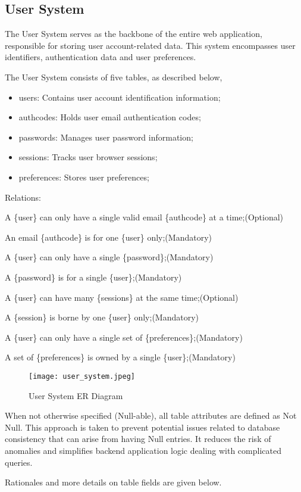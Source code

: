 \documentclass[12pt]{report}
\newcommand{\n}{\par}
\newcommand{\br}{\n\vspace{1 em}\n}
\begin{document}
\subsection{User System} \label{data-layer.design.user-system}
The User System serves as the backbone of the entire web application, responsible for storing user account-related data.
This system encompasses user identifiers, authentication data and user preferences.
\br
The User System consists of five tables, as described below,
\begin{itemize}
	\item users: Contains user account identification information;
	\item authcodes: Holds user email authentication codes;
	\item passwords: Manages user password information;
	\item sessions: Tracks user browser sessions;
	\item preferences: Stores user preferences;
\end{itemize}
Relations:\n
A \{user\} can only have a single valid email \{authcode\} at a time;\null\hfill (Optional)\n
An email \{authcode\} is for one \{user\} only;\null\hfill (Mandatory)
\br
A \{user\} can only have a single \{password\};\null\hfill (Mandatory)\n
A \{password\} is for a single \{user\};\null\hfill (Mandatory)
\br
A \{user\} can have many \{sessions\} at the same time;\null\hfill (Optional)\n
A \{session\} is borne by one \{user\} only;\null\hfill (Mandatory)
\br
A \{user\} can only have a single set of \{preferences\};\null\hfill (Mandatory)\n
A set of \{preferences\} is owned by a single \{user\};\null\hfill (Mandatory)
\begin{figure}[h!]
	\centering
	\texttt{[image: user\_system.jpeg]}
	\caption{User System ER Diagram}
	\label{fig:user-system-er}
\end{figure}
\br
When not otherwise specified (Null-able), all table attributes are defined as Not Null.
This approach is taken to prevent potential issues related to database consistency that can arise from having Null entries.
It reduces the risk of anomalies and simplifies backend application logic dealing with complicated queries.
\br
Rationales and more details on table fields are given below.\n
\end{document}
